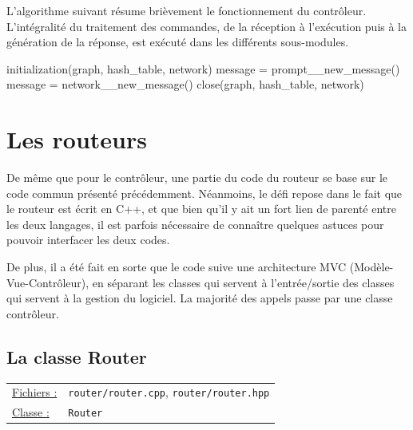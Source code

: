\documentclass[a4paper,11pt]{article}
\begin{document}
L'algorithme suivant résume brièvement le fonctionnement du contrôleur. L'intégralité du traitement des commandes, de la réception à l'exécution puis à la génération de la réponse, est exécuté dans les différents sous-modules.

\begin{algorithm}[H]
 initialization(graph, hash\_table, network)\;
  {
 	message = prompt\_\_new\_message()\;
 	\BlankLine
 	message = network\_\_new\_message()\;
 	\BlankLine
 }
 close(graph, hash\_table, network)\;
\end{algorithm}

\section{Les routeurs} %

De même que pour le contrôleur, une partie du code du routeur se base sur le code commun présenté précédemment. Néanmoins, le défi repose dans le fait que le routeur est écrit en C++, et que bien qu'il y ait un fort lien de parenté entre les deux langages, il est parfois nécessaire de connaître quelques astuces pour pouvoir interfacer les deux codes.

De plus, il a été fait en sorte que le code suive une architecture MVC (Modèle-Vue-Contrôleur), en séparant les classes qui servent
à l'entrée/sortie des classes qui servent à la gestion du logiciel. La majorité des appels passe par une classe contrôleur.

\subsection{La classe Router}

\begin{tabularx}{\linewidth}{lX}
\underline{Fichiers :} & \texttt{router/router.cpp}, \texttt{router/router.hpp}\\
\underline{Classe :} & \texttt{Router}\\
\end{tabularx}\\
\end{document}
